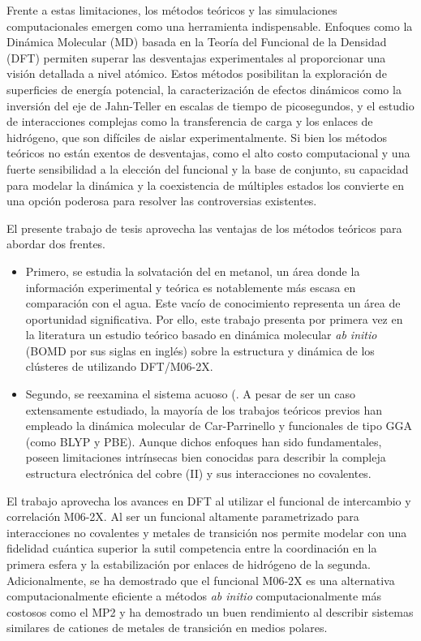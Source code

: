 Frente a estas limitaciones, los métodos teóricos y las simulaciones computacionales emergen como una herramienta indispensable. Enfoques como la Dinámica Molecular (MD) basada en la Teoría del Funcional de la Densidad (DFT) permiten superar las desventajas experimentales al proporcionar una visión detallada a nivel atómico. Estos métodos posibilitan la exploración de superficies de energía potencial, la caracterización de efectos dinámicos como la inversión del eje de Jahn-Teller en escalas de tiempo de picosegundos, y el estudio de interacciones complejas como la transferencia de carga y los enlaces de hidrógeno, que son difíciles de aislar experimentalmente. Si bien los métodos teóricos no están exentos de desventajas, como el alto costo computacional y una fuerte sensibilidad a la elección del funcional y la base de conjunto, su capacidad para modelar la dinámica y la coexistencia de múltiples estados los convierte en una opción poderosa para resolver las controversias existentes.

El presente trabajo de tesis aprovecha las ventajas de los métodos teóricos para abordar dos frentes. 

\begin{itemize}
    \item Primero, se estudia la solvatación del  en metanol, un área donde la información experimental y teórica es notablemente más escasa en comparación con el agua. Este vacío de conocimiento representa un área de oportunidad significativa. Por ello, este trabajo presenta por primera vez en la literatura un estudio teórico  basado en dinámica molecular \textit{ab initio} (BOMD por sus siglas en inglés) sobre la estructura y dinámica de los clústeres de  utilizando DFT/M06-2X.
    \item  Segundo, se reexamina el sistema acuoso (. A pesar de ser un caso extensamente estudiado, la mayoría de los trabajos teóricos previos han empleado la dinámica molecular de Car-Parrinello y funcionales de tipo GGA (como BLYP y PBE). Aunque dichos enfoques han sido fundamentales, poseen limitaciones intrínsecas bien conocidas para describir la compleja estructura electrónica del cobre (II) y sus interacciones no covalentes.
\end{itemize}

El trabajo aprovecha los avances en DFT al utilizar el funcional de intercambio y correlación M06-2X. Al ser un funcional altamente parametrizado para interacciones no covalentes y metales de transición \cite{DFT-2008-01} nos permite modelar con una fidelidad cuántica superior la sutil competencia entre la coordinación en la primera esfera y la estabilización por enlaces de hidrógeno de la segunda. Adicionalmente, se ha demostrado que el funcional M06-2X es una alternativa computacionalmente eficiente a métodos \textit{ab initio} computacionalmente más costosos como el MP2 y ha demostrado un buen rendimiento al describir sistemas similares de cationes de metales de transición en medios polares.

